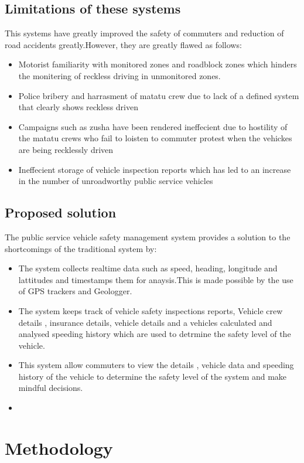 \documentclass[a4paper, 12pt]{report}
\begin{document}
\section{Limitations of these systems}
\noindent This systems have greatly improved the safety of commuters and reduction of road
accidents greatly.However, they are greatly flawed as follows:
\begin{itemize}
\item Motorist familiarity with monitored zones and roadblock zones which hinders
the monitering of reckless driving in unmonitored zones.
\item Police bribery and harrasment of matatu crew due to lack of a defined system
that clearly shows reckless driven
\item Campaigns such as zusha have been rendered ineffecient due to hostility of the matatu crews who fail to loisten to commuter protest when the vehickes are being recklessly driven
\item Ineffecient storage of vehicle inspection reports which has led to an increase
in the number of unroadworthy public service vehicles

\end{itemize}
\section{Proposed solution}

\noindent The public service vehicle safety management system provides a solution to the shortcomings of the traditional system by:
\begin{itemize}
\item The system collects realtime data such as speed, heading, longitude and
lattitudes and timestamps them for anaysis.This is made possible by the use
of GPS trackers and Geologger.
\item The system keeps track of vehicle safety inspections reports, Vehicle crew
details , insurance details, vehicle details and a vehicles calculated and analysed speeding history which are used to detrmine the safety level of the
vehicle.
\item This system allow commuters to view the details , vehicle data and speeding
history of the vehicle to determine the safety level of the system and make
mindful decisions.
\item 
\end{itemize}
\chapter{Methodology}
\end{document}
